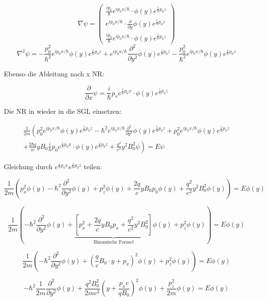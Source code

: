 \[\nabla\psi = \begin{pmatrix} \frac{ip_0}{\hbar}e^{ip_0x/\hbar}\cdot\phi(y)e^{\frac{i}{\hbar}p_0z} \\ e^{ip_0x/\hbar}\cdot\frac{\partial}{\partial y}\phi(y)e^{\frac{i}{\hbar}p_0z}\\\frac{ip_0}{\hbar}e^{ip_0x/\hbar}\cdot\phi(y)e^{\frac{i}{\hbar}p_0z} \end{pmatrix}  \]
\[\nabla^2\psi =- \frac{p_0^2}{\hbar^2}e^{ip_0x/\hbar}\phi(y)e^{\frac{i}{\hbar}p_0z} + e^{ip_0x/\hbar}\frac{\partial^2}{\partial y^2}\phi(y)e^{\frac{i}{\hbar}p_0z}  - \frac{p_0^2}{\hbar^2}e^{ip_0x/\hbar}\phi(y)e^{\frac{i}{\hbar}p_0z}\]

Ebenso die Ableitung nach x NR:

\[\frac{\partial}{\partial x}\psi =\frac{i}{\hbar}p_x e^{\frac{i}{\hbar}p_0x}\cdot \phi(y) e^{\frac{i}{\hbar}p_0z} \]


Die NR in wieder in die SGL einsetzen:


\[\begin{split} \frac{1}{2m}\left(p_0^2e^{ip_0x/\hbar}\phi(y)e^{\frac{i}{\hbar}p_0z} -\hbar^2e^{ip_0x/\hbar}\frac{\partial^2}{\partial y^2}\phi(y)e^{\frac{i}{\hbar}p_0z} + p_0^2e^{ip_0x/\hbar}\phi(y)e^{\frac{i}{\hbar}p_0z}  \right. \\
\left.  + \frac{2 \hbar q}{ic} yB_0\frac{i}{\hbar}p_0 e^{\frac{i}{\hbar}p_0x}\cdot \phi(y)e^{\frac{i}{\hbar}p_0z}  + \frac{q^2}{c^2}y^2B_0^2\psi \right) = E\psi \end{split} \]

Gleichung durch \( e^{\frac{i}{\hbar}p_0x} e^{\frac{i}{\hbar}p_0z} \) teilen:

\[ \frac{1}{2m}\left(p_x^2\phi(y) - \hbar^2 \frac{\partial^2}{\partial y^2}\phi(y) + p_z^2\phi(y) + \frac{2 q}{c} yB_0p_0  \phi(y)  + \frac{q^2}{c^2}y^2B_0^2\phi(y) \right) = E \phi(y) \]


\[  \frac{1}{2m}\left(- \hbar^2\frac{\partial^2}{\partial y^2}\phi(y) +  \underbrace{\left[p_x^2 + \frac{2 q}{c} yB_0p_x   + \frac{q^2}{c^2}y^2B_0^2\right]}_{\text{Binomische Formel}}\phi(y) + p_z^2\phi(y) \right) = E \phi(y) \]

\[  \frac{1}{2m}\left(-\hbar^2 \frac{\partial^2}{\partial y^2}\phi(y) +  (\frac{q}{c}B_0\cdot y +  p_x )^2\phi(y) + p_z^2\phi(y) \right) = E \phi(y) \]


\[ - \hbar^2\frac{1}{2m} \frac{\partial^2}{\partial y^2}\phi(y) + \frac{q^2 B_0^2}{2mc^2} (y +  \frac{p_xc}{qB_0} )^2\phi(y) +\frac{p_z^2}{2m}\phi(y)  = E \phi(y) \]


